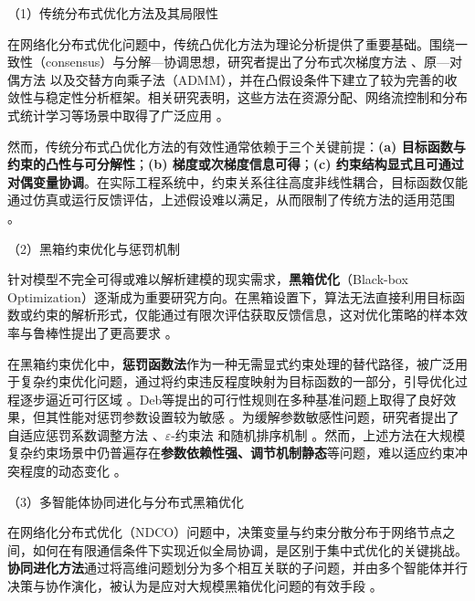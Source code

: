 \begin{titlepage}
\vspace{0.3cm}

\par
\indent（1）传统分布式优化方法及其局限性

在网络化分布式优化问题中，传统凸优化方法为理论分析提供了重要基础。围绕一致性（consensus）与分解—协调思想，研究者提出了分布式次梯度方法 \cite{nedic2009}、原—对偶方法 \cite{nedic2010,ozdaglar2011} 以及交替方向乘子法（ADMM）\cite{boyd2011}，并在凸假设条件下建立了较为完善的收敛性与稳定性分析框架。相关研究表明，这些方法在资源分配、网络流控制和分布式统计学习等场景中取得了广泛应用 \cite{nedic2017,shi2015}。

然而，传统分布式凸优化方法的有效性通常依赖于三个关键前提：\textbf{(a) 目标函数与约束的凸性与可分解性}；\textbf{(b) 梯度或次梯度信息可得}；\textbf{(c) 约束结构显式且可通过对偶变量协调}。在实际工程系统中，约束关系往往高度非线性耦合，目标函数仅能通过仿真或运行反馈评估，上述假设难以满足，从而限制了传统方法的适用范围 \cite{ghadimi2013,wang2014}。

\par
\indent（2）黑箱约束优化与惩罚机制

针对模型不完全可得或难以解析建模的现实需求，\textbf{黑箱优化}（Black-box Optimization）逐渐成为重要研究方向。在黑箱设置下，算法无法直接利用目标函数或约束的解析形式，仅能通过有限次评估获取反馈信息，这对优化策略的样本效率与鲁棒性提出了更高要求 \cite{back1996,hansen2001}。

在黑箱约束优化中，\textbf{惩罚函数法}作为一种无需显式约束处理的替代路径，被广泛用于复杂约束优化问题，通过将约束违反程度映射为目标函数的一部分，引导优化过程逐步逼近可行区域 \cite{deb2000,mezuramontes2011}。Deb等提出的可行性规则在多种基准问题上取得了良好效果，但其性能对惩罚参数设置较为敏感 \cite{coello2002}。为缓解参数敏感性问题，研究者提出了自适应惩罚系数调整方法 \cite{li2019}、$\varepsilon$-约束法 \cite{takahama2006} 和随机排序机制 \cite{runarsson2000}。然而，上述方法在大规模复杂约束场景中仍普遍存在\textbf{参数依赖性强、调节机制静态}等问题，难以适应约束冲突程度的动态变化 \cite{mezuramontes2011,besbes2015}。

\par
\indent（3）多智能体协同进化与分布式黑箱优化

在网络化分布式优化（NDCO）问题中，决策变量与约束分散分布于网络节点之间，如何在有限通信条件下实现近似全局协调，是区别于集中式优化的关键挑战。\textbf{协同进化方法}通过将高维问题划分为多个相互关联的子问题，并由多个智能体并行决策与协作演化，被认为是应对大规模黑箱优化问题的有效手段 \cite{potter1994,omidvar2014,li2012survey}。


\end{titlepage}
